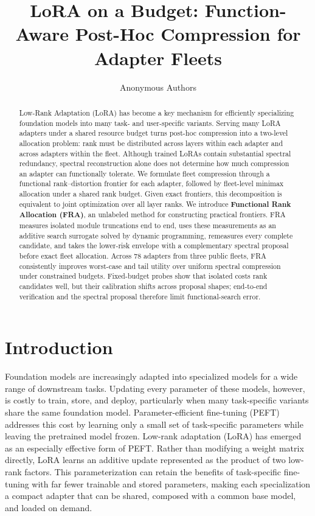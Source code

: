 \documentclass{article}
\title{LoRA on a Budget: Function-Aware Post-Hoc Compression for Adapter Fleets}
\author{Anonymous Authors}
\begin{document}
\maketitle
\enlargethispage{3.5\baselineskip}

\begin{abstract}
Low-Rank Adaptation (LoRA) has become a key mechanism for efficiently
specializing foundation models into many task- and user-specific variants. Serving many LoRA adapters under a shared resource budget turns post-hoc
compression into a two-level allocation problem: rank must be distributed
across layers within each adapter and across adapters within the fleet.
Although trained LoRAs contain substantial spectral redundancy, spectral
reconstruction alone does not determine how much compression an adapter can
functionally tolerate. We formulate fleet compression through a functional rank--distortion frontier
for each adapter, followed by fleet-level minimax allocation under a shared
rank budget. Given exact frontiers, this decomposition is equivalent to joint
optimization over all layer ranks. We introduce \textbf{Functional Rank Allocation (FRA)}, an unlabeled method for constructing practical frontiers.
FRA measures isolated module truncations end to end, uses these measurements as
an additive search surrogate solved by dynamic programming, remeasures every
complete candidate, and takes the lower-risk envelope with a complementary
spectral proposal before exact fleet allocation. Across 78 adapters from three
public fleets, FRA consistently improves worst-case and tail utility over
uniform spectral compression under constrained budgets. Fixed-budget probes
show that isolated costs rank candidates well, but their calibration shifts
across proposal shapes; end-to-end verification and the spectral proposal
therefore limit functional-search error.
\end{abstract}

\section{Introduction}
\label{sec:intro}

Foundation models are increasingly adapted into specialized models for a wide
range of downstream tasks. Updating every parameter of these models, however,
is costly to train, store, and deploy, particularly when many task-specific
variants share the same foundation model. Parameter-efficient fine-tuning
(PEFT) addresses this cost by learning only a small set of task-specific
parameters while leaving the pretrained model frozen. Low-rank adaptation
(LoRA) \citep{hu2022lora} has emerged as an especially effective form of PEFT.
Rather than modifying a weight matrix directly, LoRA learns an additive update
represented as the product of two low-rank factors. This parameterization can
retain the benefits of task-specific fine-tuning with far fewer trainable and
stored parameters, making each specialization a compact adapter that can be
shared, composed with a common base model, and loaded on demand.
\end{document}
